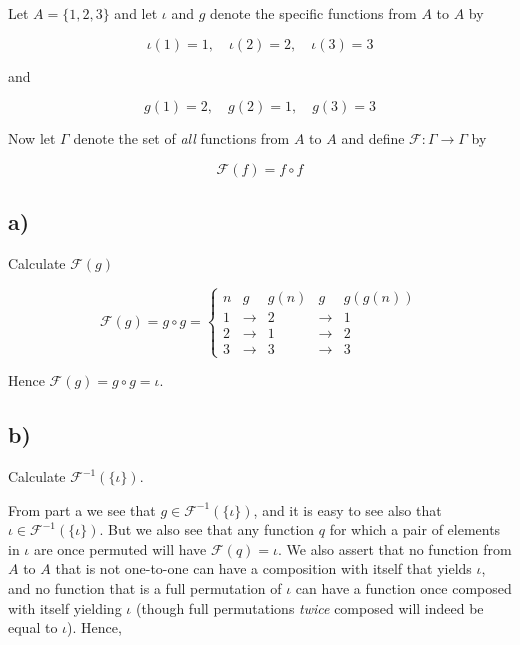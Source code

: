 \documentclass{article}
\begin{document}
Let $A = \{1, 2, 3\}$ and let $\iota$ and $g$ denote the specific functions from $A$ to $A$ by 

\begin{equation*}
  \iota(1) = 1,\quad \iota(2) = 2,\quad \iota(3) = 3
\end{equation*}

and 

\begin{equation*}
  g(1) = 2, \quad g(2) = 1, \quad g(3) = 3
\end{equation*}

Now let $\Gamma$ denote the set of \emph{all} functions from $A$ to $A$ and define $\mathcal{F}: \Gamma \rightarrow \Gamma$ by 

\begin{equation*} 
  \mathcal{F}(f) = f \circ f
\end{equation*}

\subsection*{a)}

Calculate $\mathcal{F}(g)$

\begin{equation*}
    \mathcal{F}(g) = g \circ g = \left\{
      \begin{array}{ccccc}
        n &g           &g(n) &g           &g(g(n)) \\
        1 &\rightarrow &2    &\rightarrow &1       \\
        2 &\rightarrow &1    &\rightarrow &2       \\
        3 &\rightarrow &3    &\rightarrow &3       
    \end{array}\right.
  \end{equation*}

Hence $\mathcal{F}(g) = g \circ g = \iota$. 

\subsection*{b)}

Calculate $\mathcal{F}^{-1}(\{\iota\})$. 

From part a we see that $g \in \mathcal{F}^{-1}(\{\iota\})$, and it is easy to see also that $\iota \in \mathcal{F}^{-1}(\{\iota\})$.
But we also see that any function $q$ for which a pair of elements in $\iota$ are once permuted will have $\mathcal{F}(q) = \iota$. 
We also assert that no function from $A$ to $A$ that is not one-to-one can have a composition with itself that yields $\iota$, 
and no function that is a full permutation of $\iota$ can have a function once composed with itself yielding $\iota$ (though full permutations \emph{twice} composed will indeed be equal to $\iota$). Hence, 
\end{document}
